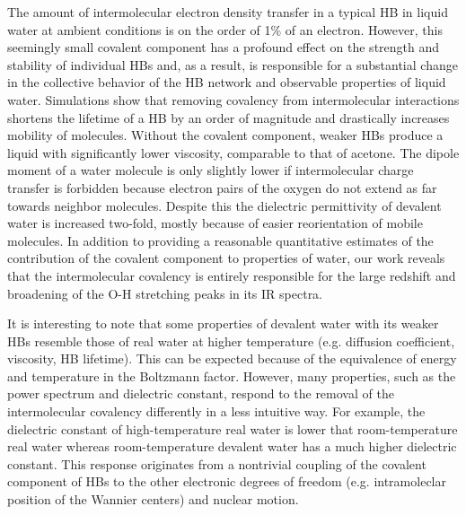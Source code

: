 \documentclass[aps,prl,reprint,amsmath,amssymb]{revtex4-1}
\begin{document}
The amount of intermolecular electron density transfer in a typical HB in liquid water at ambient conditions is on the order of 1\% of an electron. 
However, this seemingly small covalent component has a profound effect on the strength and stability of individual HBs and, as a result, is responsible for a substantial change in the collective behavior of the HB network and observable properties of liquid water. 
Simulations show that removing covalency from intermolecular interactions shortens the lifetime of a HB by an order of magnitude and drastically increases mobility of molecules. 
Without the covalent component, weaker HBs produce a liquid with significantly lower viscosity, comparable to that of acetone. 
The dipole moment of a water molecule is only slightly lower if intermolecular charge transfer is forbidden because electron pairs of the oxygen do not extend as far towards neighbor molecules. 
Despite this the dielectric permittivity of devalent water is increased two-fold, mostly because of easier reorientation of mobile molecules. 
In addition to providing a reasonable quantitative estimates of the contribution of the covalent component to properties of water, our work reveals that the intermolecular covalency is entirely responsible for the large redshift and broadening of the O-H stretching peaks in its IR spectra. 

It is interesting to note that some properties of devalent water with its weaker HBs resemble those of real water at higher temperature (e.g. diffusion coefficient, viscosity, HB lifetime). 
This can be expected because of the equivalence of energy and temperature in the Boltzmann factor. However, many properties, such as the power spectrum and dielectric constant, respond to the removal of the intermolecular covalency differently in a less intuitive way. 
For example, the dielectric constant of high-temperature real water is lower that room-temperature real water whereas room-temperature devalent water has a much higher dielectric constant. 
This response originates from a nontrivial coupling of the covalent component of HBs to the other electronic degrees of freedom (e.g. intramoleclar position of the Wannier centers) and nuclear motion.
\end{document}

